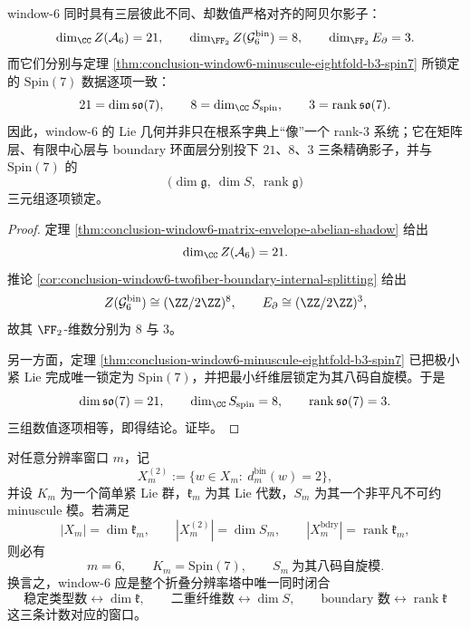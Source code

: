 \begin{theorem}[三重阿贝尔影子的精确对齐]\label{thm:conclusion-window6-triple-abelian-shadow-coincidence}
window-\(6\) 同时具有三层彼此不同、却数值严格对齐的阿贝尔影子：
\[
\dim_{\CC} Z(\mathcal A_6)=21,\qquad
\dim_{\FF_2} Z(\mathcal G_6^{\mathrm{bin}})=8,\qquad
\dim_{\FF_2} E_{\partial}=3.
\]
而它们分别与定理 \ref{thm:conclusion-window6-minuscule-eightfold-b3-spin7} 所锁定的 \(\mathrm{Spin}(7)\) 数据逐项一致：
\[
21=\dim \mathfrak{so}(7),\qquad
8=\dim_{\CC} S_{\mathrm{spin}},\qquad
3=\operatorname{rank}\mathfrak{so}(7).
\]
因此，window-\(6\) 的 Lie 几何并非只在根系字典上“像”一个 rank-\(3\) 系统；它在矩阵层、有限中心层与 boundary 环面层分别投下 \(21\)、\(8\)、\(3\) 三条精确影子，并与 \(\mathrm{Spin}(7)\) 的
\[
\bigl(\dim \mathfrak g,\ \dim S,\ \operatorname{rank}\mathfrak g\bigr)
\]
三元组逐项锁定。
\end{theorem}
\begin{proof}
定理 \ref{thm:conclusion-window6-matrix-envelope-abelian-shadow} 给出
\[
\dim_{\CC} Z(\mathcal A_6)=21.
\]
推论 \ref{cor:conclusion-window6-twofiber-boundary-internal-splitting} 给出
\[
Z(\mathcal G_6^{\mathrm{bin}})\cong(\ZZ/2\ZZ)^8,
\qquad
E_{\partial}\cong(\ZZ/2\ZZ)^3,
\]
故其 \(\FF_2\)-维数分别为 \(8\) 与 \(3\)。

另一方面，定理 \ref{thm:conclusion-window6-minuscule-eightfold-b3-spin7} 已把极小紧 Lie 完成唯一锁定为 \(\mathrm{Spin}(7)\)，并把最小纤维层锁定为其八码自旋模。于是
\[
\dim \mathfrak{so}(7)=21,\qquad
\dim_{\CC} S_{\mathrm{spin}}=8,\qquad
\operatorname{rank}\mathfrak{so}(7)=3.
\]
三组数值逐项相等，即得结论。证毕。
\end{proof}

\begin{conjecture}\label{conj:conclusion-window6-21-8-3-uniqueness}
对任意分辨率窗口 \(m\)，记
\[
X_m^{(2)}:=\{w\in X_m:\ d_m^{\mathrm{bin}}(w)=2\},
\]
并设 \(K_m\) 为一个简单紧 Lie 群，\(\mathfrak k_m\) 为其 Lie 代数，\(S_m\) 为其一个非平凡不可约 minuscule 模。若满足
\[
|X_m|=\dim \mathfrak k_m,\qquad
|X_m^{(2)}|=\dim S_m,\qquad
|X_m^{\mathrm{bdry}}|=\operatorname{rank}\mathfrak k_m,
\]
则必有
\[
m=6,\qquad
K_m=\mathrm{Spin}(7),\qquad
S_m\ \text{为其八码自旋模}.
\]
换言之，window-\(6\) 应是整个折叠分辨率塔中唯一同时闭合
\[
\text{稳定类型数}\leftrightarrow \dim \mathfrak k,\qquad
\text{二重纤维数}\leftrightarrow \dim S,\qquad
\text{boundary 数}\leftrightarrow \operatorname{rank}\mathfrak k
\]
这三条计数对应的窗口。
\end{conjecture}

